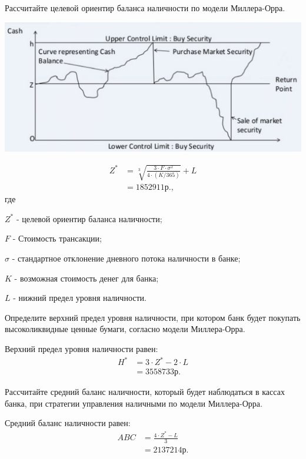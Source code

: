 \documentclass[12pt, table, a4paper,twoside]{exam}
\begin{document}
\begin{questions}
\begin{subparts}
	\subpart[5] Рассчитайте целевой ориентир баланса наличности по модели Миллера-Орра.	
	\begin{solution}[12em]
		
		\centering
		\includegraphics[scale=0.45 ,clip]
		{img/MillerOrr}
				
		\begin{align}
		Z^*&=\sqrt[3]{\frac{3 \cdot F \cdot \sigma^2}{4 \cdot (K/365)}}+L\\
		&=1 852 911\text{р.},\nonumber
		\end{align}
		где
		
		$Z^*$ - целевой ориентир баланса наличности;
		
		$F$ - Стоимость трансакции;

		$\sigma$ - стандартное отклонение дневного потока наличности в банке;

		$K$ - возможная стоимость денег для банка;

		$L$ - нижний предел уровня наличности.
		
	\end{solution}

\vfill\null\pagebreak
	\subpart[5] Определите верхний предел уровня наличности, при котором банк будет покупать высоколиквидные ценные бумаги, согласно модели Миллера-Орра.
	\begin{solution}[12em] 
		Верхний предел уровня наличности равен:
		\begin{align}
		H^*&=3 \cdot Z^* - 2 \cdot L\\
		&=3 558 733\text{р.}\nonumber
		\end{align}
	\end{solution}

	\subpart[5] Рассчитайте средний баланс наличности, который будет наблюдаться в кассах банка, при стратегии управления наличными по модели Миллера-Орра.
	\begin{solution}[12em]
		Средний баланс наличности равен:
		\begin{align}
		ABC&=\frac{4 \cdot Z^*-L}{3}\\
		&=2 137 214\text{р.}\nonumber
		\end{align}	
	\end{solution}
	

\end{subparts}
\end{questions}
\end{document}
